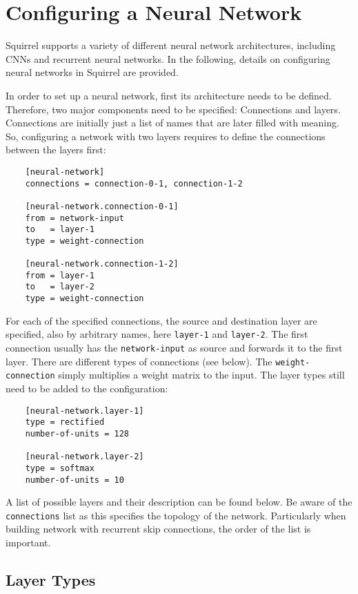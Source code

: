 \section{Configuring a Neural Network}


Squirrel supports a variety of different neural network architectures, including CNNs and recurrent neural networks. In the following, details on configuring neural networks in Squirrel are provided.

In order to set up a neural network, first its architecture needs to be defined. Therefore, two major components need to be specified: Connections and layers. Connections are initially just a list of names that are later filled with meaning. So, configuring a network with two layers requires to define the connections between the layers first:


\begin{verbatim}
    [neural-network]
    connections = connection-0-1, connection-1-2

    [neural-network.connection-0-1]
    from = network-input
    to   = layer-1
    type = weight-connection

    [neural-network.connection-1-2]
    from = layer-1
    to   = layer-2
    type = weight-connection
\end{verbatim}

For each of the specified connections, the source and destination layer are specified, also by arbitrary names, here \texttt{layer-1} and \texttt{layer-2}. The first connection usually has the \texttt{network-input} as source and forwards it to the first layer. There are different types of connections (see below). The \texttt{weight-connection} simply multiplies a weight matrix to the input. The layer types still need to be added to the configuration:

\begin{verbatim}
    [neural-network.layer-1]
    type = rectified
    number-of-units = 128

    [neural-network.layer-2]
    type = softmax
    number-of-units = 10
\end{verbatim}

A list of possible layers and their description can be found below. Be aware of the \texttt{connections} list as this specifies the topology of the network. Particularly when building network with recurrent skip connections, the order of the list is important.


\subsection{Layer Types}

